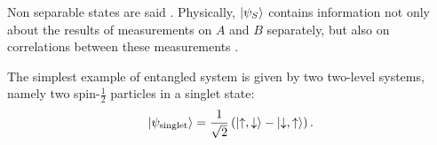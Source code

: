 Non separable states are said .
Physically,
$\ket{\psi_S}$ contains information
not only about the results of measurements on $A$ and $B$ separately,
but also on correlations between these measurements
\parencite{Haroche_Exploring}.

The simplest example of entangled system is given by two two-level systems,
namely two spin-$\frac{1}{2}$ particles in a singlet state:
\[
  \ket{\psi_{\text{singlet}}} = \frac{1}{\sqrt{2}} \left(\ket{\uparrow, \downarrow} - \ket{\downarrow, \uparrow}\right).
\]
